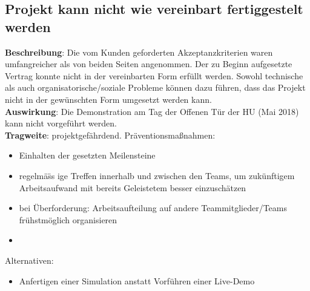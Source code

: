 \documentclass[a4paper, 12pt, titlepage]{scrartcl}
\begin{document}
	\subsection{Projekt kann nicht wie vereinbart fertiggestelt werden}
		\textbf{Beschreibung}: Die vom Kunden geforderten Akzeptanzkriterien waren umfangreicher als von beiden Seiten angenommen. Der zu Beginn aufgesetzte Vertrag konnte nicht in der vereinbarten Form erf\"ullt werden. Sowohl technische als auch organisatorische/soziale Probleme k\"onnen dazu f\"uhren, dass das Projekt nicht in der gew\"unschten Form umgesetzt werden kann.\\
		\textbf{Auswirkung}: Die Demonstration am Tag der Offenen T\"ur der HU (Mai 2018) kann nicht vorgef\"uhrt werden.\\
		\textbf{Tragweite}: projektgef\"ahrdend. 
		Pr\"aventionsma\ss nahmen:
			\begin{itemize}
				\item Einhalten der gesetzten Meilensteine
				\item regelm\"a\"ss ige Treffen innerhalb und zwischen den Teams, um zuk\"unftigem Arbeitsaufwand mit bereits Geleistetem besser einzusch\"atzen
				\item bei \"Uberforderung: Arbeitsaufteilung auf andere Teammitglieder/Teams fr\"uhstm\"oglich organisieren
				\item 
			\end{itemize}
		Alternativen: 
			\begin{itemize}
				\item Anfertigen einer Simulation anstatt Vorf\"uhren einer Live-Demo
			\end{itemize}
		
\end{document}
